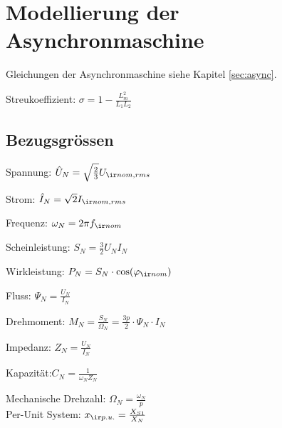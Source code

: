 \documentclass[german]{latex4ei_fs}
\begin{document}
\section{Modellierung der Asynchronmaschine}

\begin{sectionbox}
Gleichungen der Asynchronmaschine siehe Kapitel \ref{sec:async}.

Streukoeffizient: $\sigma = 1 - \frac{L_m^2}{L_1 L_2}$
\end{sectionbox}

\begin{sectionbox}
\subsection{Bezugsgrössen}

Spannung: $\hat U_N = \sqrt{\frac{2}{3}} U_{\ir nom, rms} $


Strom: $\hat I_N = \sqrt 2 I_{\ir nom, rms}$

Frequenz: $\omega_N = 2\pi f_{\ir nom}$

Scheinleistung: $S_N = \frac{3}{2} U_N I_N$

Wirkleistung: $P_N = S_N \cdot \cos(\varphi_{\ir nom})$

Fluss: $\Psi_N = \frac{U_N}{I_N}$

Drehmoment: $M_N = \frac{S_N}{\Omega_N} = \frac{3 p }{2} \cdot \Psi_N \cdot I_N$

Impedanz: $Z_N = \frac{U_N}{I_N}$

Kapazität:$ C_N = \frac{1}{\omega_N Z_N}$

Mechanische Drehzahl: $\Omega_N = \frac{\omega_N}{p}$ \\

Per-Unit System:
$x_{\ir p.u.} = \frac{X_{S1}}{X_N}$
\end{sectionbox}
\end{document}
